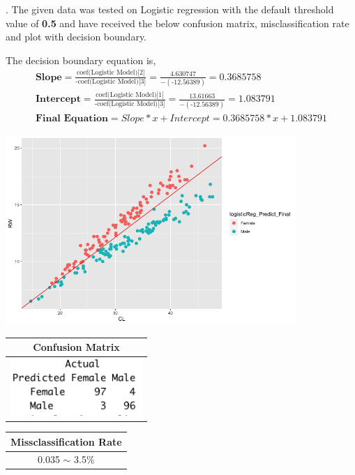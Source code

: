 \documentclass[a4paper,10pt]{article}
\begin{document}
. The given data was tested on Logistic regression with the default threshold value of \textbf{0.5} and have received
the below confusion matrix, misclassification rate and plot with decision boundary. \par
The decision boundary equation is,
    \begin{align*}
      \textbf{Slope} = \frac{\text{coef(Logistic Model)[2]}}{\text{-coef(Logistic Model)[3]}} = \frac{\text{4.630747}}{-(\text{-12.56389})} = 0.3685758 \\
      \textbf{Intercept} = \frac{\text{coef(Logistic Model)[1]}}{\text{-coef(Logistic Model)[3]}} = \frac{\text{13.61663}}{-(\text{-12.56389})} = 1.083791\\
      \textbf{Final Equation} = Slope*x+Intercept = 0.3685758*x+1.083791
    \end{align*}
  \begin{center}
    \includegraphics[width=110mm,scale=0.10]{CL_RW_Logistic_Regression_Plot.png} 
    \begin{tabular}{|c|}
      \hline
      \textbf{Confusion Matrix} \\
      \hline
      \includegraphics[width=50mm,scale=0.10]{CL_RW_Logistic_Regression_CM.png} \\
      \hline
    \end{tabular} \par
    \begin{tabular}{|c|}
      \hline
      \textbf{Missclassification Rate} \\
      \hline
      0.035 $\sim$ 3.5\% \\
      \hline
    \end{tabular}
  \end{center}
\end{document}
